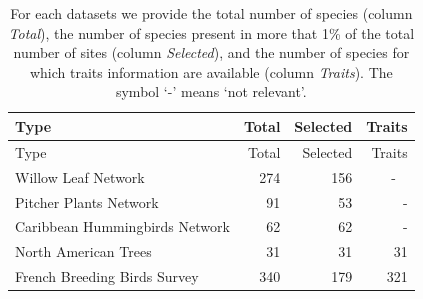 \begin{longtable}[]{@{}lrrr@{}}
\caption{For each datasets we provide the total number of species
(column \emph{Total}), the number of species present in more that 1\% of
the total number of sites (column \emph{Selected}), and the number of
species for which traits information are available (column
\emph{Traits}). The symbol `-' means `not relevant'.
\label{tbl:numsp}}\tabularnewline
\toprule
Type & Total & Selected & Traits\tabularnewline
\midrule
\endfirsthead
\toprule
Type & Total & Selected & Traits\tabularnewline
\midrule
\endhead
Willow Leaf Network & 274 & 156 & - ~\tabularnewline
Pitcher Plants Network & 91 & 53 & -\tabularnewline
Caribbean Hummingbirds Network & 62 & 62 & -\tabularnewline
North American Trees & 31 & 31 & 31\tabularnewline
French Breeding Birds Survey & 340 & 179 & 321\tabularnewline
\bottomrule
\end{longtable}

